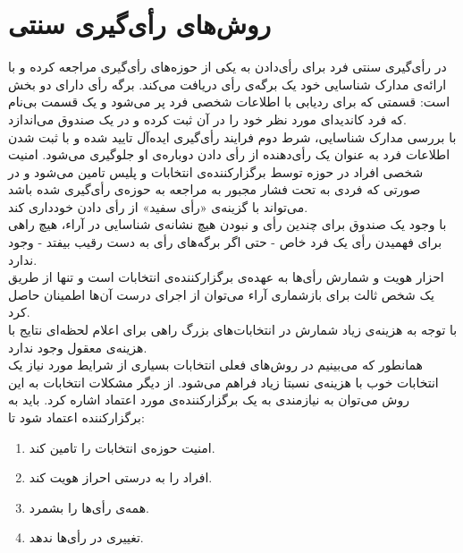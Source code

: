 \section{روش‌های رأی‌گیری سنتی}
\par
در رأی‌گیری سنتی فرد برای رأی‌دادن به یکی از حوزه‌های رأی‌گیری مراجعه کرده و با ارائه‌ی مدارک شناسایی خود یک برگه‌ی رأی دریافت می‌کند. برگه رأی دارای دو بخش است: قسمتی که برای ردیابی با اطلاعات شخصی فرد پر می‌شود و یک قسمت بی‌نام که فرد کاندیدای مورد نظر خود را در آن ثبت کرده و در یک صندوق می‌اندازد. 
\\
با بررسی مدارک شناسایی، شرط دوم فرایند رأی‌گیری ایده‌آل تایید شده و با ثبت شدن اطلاعات فرد به عنوان یک رأی‌دهنده از رأی دادن دوباره‌ی او جلوگیری می‌شود. امنیت شخصی افراد در حوزه توسط برگزارکننده‌ی انتخابات و پلیس تامین می‌شود و در صورتی که فردی به تحت فشار مجبور به مراجعه به حوزه‌ی رأی‌گیری شده باشد می‌تواند با گزینه‌ی «رأی‌ سفید» از رأی دادن خودداری کند.
\\
با وجود یک صندوق برای چندین رأی و نبودن هیچ نشانه‌ی شناسایی در آراء، هیچ راهی برای فهمیدن رأی یک فرد خاص - حتی اگر برگه‌های رأی به دست رقیب بیفتد - وجود ندارد. 
\\
احزار هویت و شمارش رأی‌ها به عهده‌ی برگزارکننده‌ی انتخابات است و تنها از طریق یک شخص ثالث برای باز‌شماری آراء می‌توان از اجرای درست آن‌ها اطمینان حاصل کرد.
\\
با توجه به هزینه‌ی زیاد شمارش در انتخابات‌های بزرگ راهی برای اعلام لحظه‌ا‌ی نتایج با هزینه‌ی معقول وجود ندارد.
\\
همانطور که می‌بینیم در روش‌های فعلی انتخابات بسیاری از شرایط مورد نیاز یک انتخابات خوب  با هزینه‌ی نسبتا زیاد فراهم می‌شود. از دیگر مشکلات انتخابات به این روش می‌توان به نیازمندی به یک برگزارکننده‌ی مورد اعتماد اشاره کرد. باید به برگزارکننده اعتماد شود تا: 
\begin{enumerate}
	\item 
	امنیت حوزه‌ی انتخابات را تامین کند.
	\item 
	افراد را به درستی احراز هویت کند.
	\item 
	همه‌ی رأی‌ها را بشمرد.
	\item 
	تغییری در رأی‌ها ندهد.
	
\end{enumerate}
 

